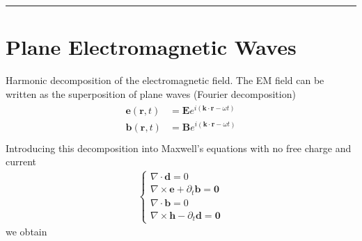 \documentclass[letterpaper,10pt,english]{jupyterBook}
\begin{document}
\bigskip\hrule\bigskip


\sphinxstepscope




\section{Plane Electromagnetic Waves}
\label{\detokenize{ch/waves-plane:plane-electromagnetic-waves}}\label{\detokenize{ch/waves-plane:classical-electromagnetism-waves-plane-waves}}\label{\detokenize{ch/waves-plane::doc}}
\sphinxAtStartPar
Harmonic decomposition of the electromagnetic field. The EM field can be written as the superposition of plane waves (Fourier decomposition)
\begin{equation*}
\begin{split}\begin{aligned}
  \mathbf{e}(\mathbf{r},t) & = \mathbf{E} e^{i(\mathbf{k} \cdot \mathbf{r} - \omega t)} \\
  \mathbf{b}(\mathbf{r},t) & = \mathbf{B} e^{i(\mathbf{k} \cdot \mathbf{r} - \omega t)} \\
\end{aligned}\end{split}
\end{equation*}
\sphinxAtStartPar
Introducing this decomposition into Maxwell’s equations with no free charge and current
\begin{equation*}
\begin{split}
\begin{cases}
 \nabla \cdot \mathbf{d} = 0 \\
 \nabla \times \mathbf{e} + \partial_t \mathbf{b} = \mathbf{0} \\
 \nabla \cdot \mathbf{b} = 0 \\
 \nabla \times \mathbf{h} - \partial_t \mathbf{d} = \mathbf{0}
\end{cases}
\end{split}
\end{equation*}
\sphinxAtStartPar
we obtain
\end{document}
